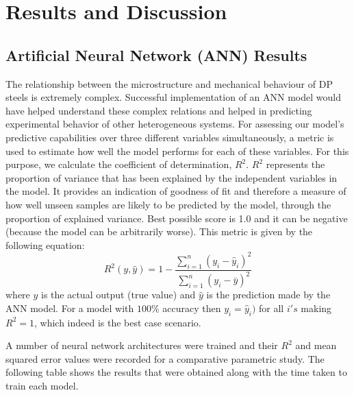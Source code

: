 
\chapter{Results and Discussion} %

\label{Chapter4} %



\section{Artificial Neural Network (ANN) Results}
The relationship between the microstructure and mechanical behaviour of DP steels is extremely complex. Successful implementation of an ANN model would have helped understand these complex relations and helped in predicting experimental behavior of other heterogeneous systems. For assessing our model's predictive capabilities over three different variables simultaneously, a metric is used to estimate how well the model performs for each of these variables. For this purpose, we calculate the coefficient of determination, $R^2$. $R^2$ represents the proportion of variance that has been explained by the independent variables in the model. It provides an indication of goodness of fit and therefore a measure of how well unseen samples are likely to be predicted by the model, through the proportion of explained variance. Best possible score is 1.0 and it can be negative (because the model can be arbitrarily worse). This metric is given by the following equation:
\begin{equation}
    R^2(y, \hat{y}) = 1 - \frac{\sum_{i=1}^{n} (y_i - \hat{y}_i)^2}{\sum_{i=1}^{n} (y_i - \bar{y})^2}
\end{equation}
where $y$ is the actual output (true value) and $\hat{y}$ is the prediction made by the ANN model. For a model with $100\%$ accuracy then $y_i = \hat{y}_i)$ for all $i's$ making $R^2 = 1$, which indeed is the best case scenario. 

A number of neural network architectures were trained and their $R^2$ and mean squared error values were recorded for a comparative parametric study. The following table shows the results that were obtained along with the time taken to train each model. 

